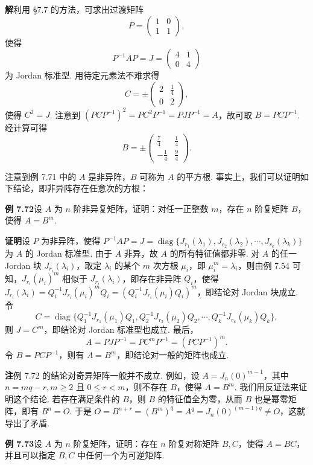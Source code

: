 \documentclass[UTF8, 12pt, fontset=fandol, oneside]{ctexart}
\begin{document}
\noindent\textbf{解}\quad 利用 §7.7 的方法，可求出过渡矩阵
\[
P=\left(\begin{array}{cc}1&0\\1&1\end{array}\right),
\]
使得
\[
P^{-1}AP=J=\left(\begin{array}{cc}4&1\\0&4\end{array}\right)
\]
为 Jordan 标准型. 用待定元素法不难求得
\[
C=\pm\left(\begin{array}{cc}2&\frac14\\0&2\end{array}\right),
\]
使得 $C^2=J$. 注意到 $(PCP^{-1})^2=PC^2P^{-1}=PJP^{-1}=A$，故可取 $B=PCP^{-1}$. 经计算可得
\[
B=\pm\left(\begin{array}{rr}
\frac74&\frac14\\
-\frac14&\frac94
\end{array}\right).
\]

注意到例 7.71 中的 $A$ 是非异阵，$B$ 可称为 $A$ 的平方根. 事实上，我们可以证明如下结论，即非异阵存在任意次的方根：

\noindent\textbf{例 7.72}\quad 设 $A$ 为 $n$ 阶非异复矩阵，证明：对任一正整数 $m$，存在 $n$ 阶复矩阵 $B$，使得 $A=B^m$.

\noindent\textbf{证明}\quad 设 $P$ 为非异阵，使得 $P^{-1}AP=J=\operatorname{diag}\{J_{r_1}(\lambda_1),J_{r_2}(\lambda_2),\cdots,J_{r_k}(\lambda_k)\}$ 为 $A$ 的 Jordan 标准型. 由于 $A$ 非异，故 $A$ 的所有特征值都非零. 对 $A$ 的任一 Jordan 块 $J_{r_i}(\lambda_i)$，取定 $\lambda_i$ 的某个 $m$ 次方根 $\mu_i$，即 $\mu_i^m=\lambda_i$，则由例 7.54 可知，$J_{r_i}(\mu_i)^m$ 相似于 $J_{r_i}(\lambda_i)$，即存在非异阵 $Q_i$，使得 $J_{r_i}(\lambda_i)=Q_i^{-1}J_{r_i}(\mu_i)^mQ_i=(Q_i^{-1}J_{r_i}(\mu_i)Q_i)^m$，即结论对 Jordan 块成立. 令
\[
C=\operatorname{diag}\{Q_1^{-1}J_{r_1}(\mu_1)Q_1,Q_2^{-1}J_{r_2}(\mu_2)Q_2,\cdots,Q_k^{-1}J_{r_k}(\mu_k)Q_k\},
\]
则 $J=C^m$，即结论对 Jordan 标准型也成立. 最后，
\[
A=PJP^{-1}=PC^mP^{-1}=(PCP^{-1})^m.
\]
令 $B=PCP^{-1}$，则有 $A=B^m$，即结论对一般的矩阵也成立.

\noindent\textbf{注}\quad 例 7.72 的结论对奇异矩阵一般并不成立. 例如，设 $A=J_n(0)^{m-1}$，其中 $n=mq-r,m\ge2$ 且 $0\le r<m$，则不存在 $B$，使得 $A=B^m$. 我们用反证法来证明这个结论. 若存在满足条件的 $B$，则 $B$ 的特征值全为零，从而 $B$ 也是幂零矩阵，即有 $B^n=O$. 于是 $O=B^{n+r}=(B^m)^q=A^q=J_n(0)^{(m-1)q}\ne O$，这就导出了矛盾.

\noindent\textbf{例 7.73}\quad 设 $A$ 为 $n$ 阶复矩阵，证明：存在 $n$ 阶复对称矩阵 $B,C$，使得 $A=BC$，并且可以指定 $B,C$ 中任何一个为可逆矩阵.
\end{document}

